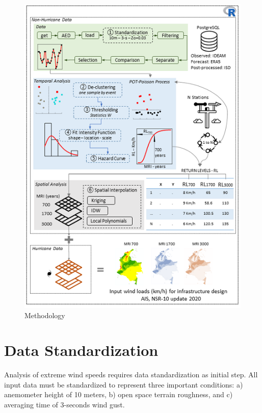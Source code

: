 \documentclass[12pt,oneside]{reedthesis}
\begin{document}
\begin{figure}

{\centering \includegraphics[width=6.26in]{figure/methodology} 

}

\caption{Methodology}\label{fig:methodology}
\end{figure}
\hypertarget{rmd-standardization}{%
\section{Data Standardization}\label{rmd-standardization}}

Analysis of extreme wind speeds requires data standardization as initial step. All input data must be standardized to represent three important conditions: a) anemometer height of 10 meters, b) open space terrain roughness, and c) averaging time of 3-seconds wind gust.
\end{document}
